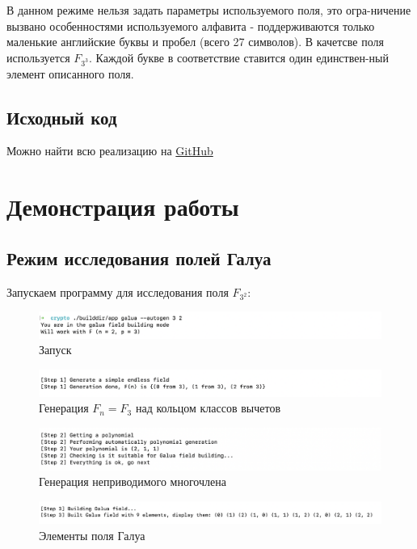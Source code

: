 \documentclass[a4paper]{article}
\begin{document}
В данном режиме нельзя задать параметры используемого поля, это огра-ничение
вызвано особенностями используемого алфавита - поддерживаются только маленькие английские буквы
и пробел (всего 27 символов). В качетсве поля используется $F_{3^3}$. Каждой букве в
соответствие ставится один единствен-ный элемент описанного поля.

\subsection{Исходный код}

Можно найти всю реализацию на \href{https://github.com/KonstantIMP/galua_crypto}{GitHub}

\newpage
\section{Демонстрация работы}

\subsection{Режим исследования полей Галуа}

Запускаем программу для исследования поля $F_{3^2}$:

\begin{figure}[H]
  \centering
  \includegraphics{14_1}
  \caption{Запуск}
\end{figure}

\begin{figure}[H]
  \centering
  \includegraphics[width=1.4\textwidth]{14_2}
  \caption{Генерация $F_n = F_3$ над кольцом классов вычетов}
\end{figure}

\begin{figure}[H]
  \centering
  \includegraphics{14_3}
  \caption{Генерация неприводимого многочлена}
\end{figure}

\begin{figure}[H]
  \centering
  \includegraphics[width=\textwidth]{14_4}
  \caption{Элементы поля Галуа}
\end{figure}
\end{document}
